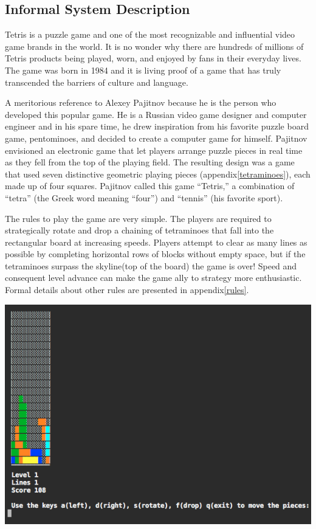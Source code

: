 \documentclass[a4paper]{article}
\begin{document}
\subsection{Informal System Description}
\label{informal-rules}

Tetris is a puzzle game and one of the most recognizable and influential video game brands in the world. It is no wonder why there are hundreds of millions of Tetris products being played, worn, and enjoyed by fans in their everyday lives. The game was born in 1984 and it is living proof of a game that has truly transcended the barriers of culture and language.

A meritorious reference to Alexey Pajitnov because he is the person who developed this popular game. He is a Russian video game designer and computer engineer and in his spare time, he drew inspiration from his favorite puzzle board game, pentominoes, and decided to create a computer game for himself. Pajitnov envisioned an electronic game that let players arrange puzzle pieces in real time as they fell from the top of the playing field. The resulting design was a game that used seven distinctive geometric playing pieces (appendix\ref{tetraminoes}), each made up of four squares. Pajitnov called this game “Tetris,” a combination of “tetra” (the Greek word meaning “four”) and “tennis” (his favorite sport).

The rules to play the game are very simple. The players are required to strategically rotate and drop a chaining of tetraminoes that fall into the rectangular board at increasing speeds. Players attempt to clear as many lines as possible by completing horizontal rows of blocks without empty space, but if the tetraminoes surpass the skyline(top of the board) the game is over! Speed and consequent level advance can make the game ally to strategy more enthusiastic. Formal details about other rules are presented in appendix\ref{rules}.

\begin{center}
	\includegraphics[scale=0.7]{resources/img/game}
	\label{use-cases}
\end{center}
\end{document}
